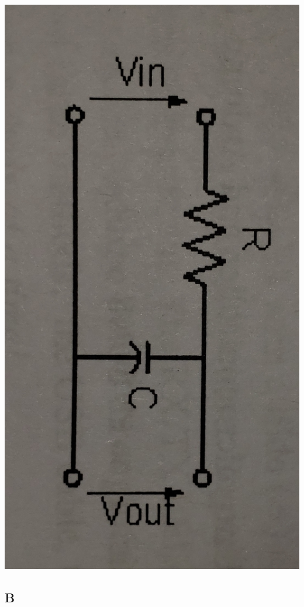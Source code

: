 \documentclass[12pt]{article}
\begin{document}
				\begin{center}
					\includegraphics[scale=0.1]{1.jpg}\\
				\end{center}

		\subsection{B}
\end{document}
